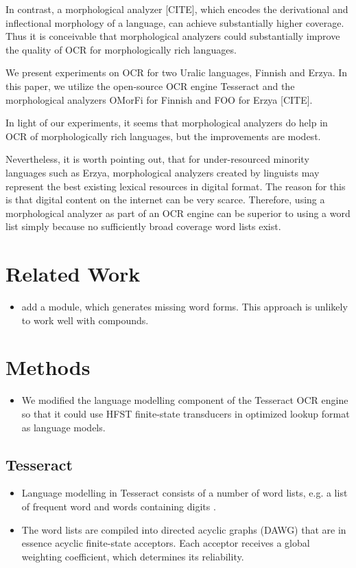 \documentclass[b5paper]{article}
\begin{document}
In contrast, a morphological analyzer [CITE], which encodes the
derivational and inflectional morphology of a language, can achieve
substantially higher coverage. Thus it is conceivable that morphological
analyzers could substantially improve the quality of OCR for
morphologically rich languages.

We present experiments on OCR for two Uralic languages, Finnish and
Erzya. In this paper, we utilize the open-source OCR engine Tesseract
\cite{smith07} and the morphological analyzers OMorFi \cite{pirinen11}
for Finnish and FOO for Erzya [CITE].

In light of our experiments, it seems that morphological analyzers do
help in OCR of morphologically rich languages, but the improvements
are modest.

Nevertheless, it is worth pointing out, that for under-resourced
minority languages such as Erzya, morphological analyzers created by
linguists may represent the best existing lexical resources in digital
format. The reason for this is that digital content on the internet
can be very scarce. Therefore, using a morphological analyzer as part
of an OCR engine can be superior to using a word list simply because
no sufficiently broad coverage word lists exist.

\section{Related Work}
\begin{itemize}
\item \cite{smith09} add a module, which generates missing word
  forms. This approach is unlikely to work well with compounds.

\end{itemize}

\section{Methods}
\begin{itemize}
\item We modified the language modelling component of the Tesseract
  OCR engine so that it could use HFST finite-state transducers in
  optimized lookup format \cite{silfverberg09} as language models.
\end{itemize}

\subsection{Tesseract}
\begin{itemize}
\item Language modelling in Tesseract consists of a number of word
  lists, e.g. a list of frequent word and words containing digits
  \cite{smith07}.
\item The word lists are compiled into directed acyclic graphs (DAWG)
  that are in essence acyclic finite-state acceptors. Each acceptor
  receives a global weighting coefficient, which determines its
  reliability.
\end{itemize}
\end{document}
